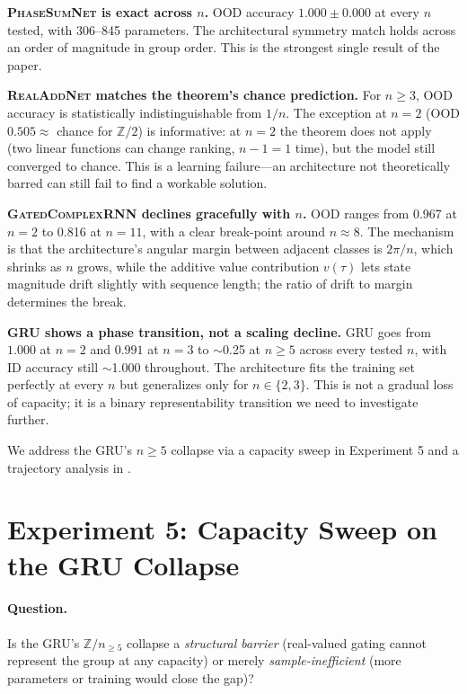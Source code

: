 \documentclass[11pt]{article}
\theoremstyle{definition}
\newcommand{\Z}{\mathbb{Z}}
\begin{document}
\textbf{\textsc{PhaseSumNet} is exact across $n$.} OOD accuracy
$1.000 \pm 0.000$ at every $n$ tested, with 306--845 parameters.
The architectural symmetry match holds across an order of magnitude
in group order. This is the strongest single result of the paper.

\textbf{\textsc{RealAddNet} matches the theorem's chance prediction.}
For $n \geq 3$, OOD accuracy is statistically indistinguishable from
$1/n$. The exception at $n=2$ (OOD $0.505 \approx$ chance for $\Z/2$)
is informative: at $n=2$ the theorem does not apply (two linear
functions can change ranking, $n-1=1$ time), but the model still
converged to chance. This is a learning failure---an architecture
not theoretically barred can still fail to find a workable
solution.

\textbf{\textsc{GatedComplexRNN} declines gracefully with $n$.}
OOD ranges from 0.967 at $n=2$ to 0.816 at $n=11$, with a clear
break-point around $n \approx 8$. The mechanism is that the
architecture's angular margin between adjacent classes is $2\pi/n$,
which shrinks as $n$ grows, while the additive value contribution
$v(\tau)$ lets state magnitude drift slightly with sequence length;
the ratio of drift to margin determines the break.

\textbf{\textsc{GRU} shows a phase transition, not a scaling decline.}
GRU goes from $1.000$ at $n=2$ and $0.991$ at $n=3$ to $\sim$0.25 at
$n \geq 5$ across every tested $n$, with ID accuracy still
$\sim$1.000 throughout. The architecture fits the training set
perfectly at every $n$ but generalizes only for $n \in \{2, 3\}$.
This is not a gradual loss of capacity; it is a binary
representability transition we need to investigate further.

We address the GRU's $n \geq 5$ collapse via a capacity sweep in
Experiment 5 and a trajectory analysis in .


\section{Experiment 5: Capacity Sweep on the GRU Collapse}
\label{sec:exp5}

\paragraph{Question.} Is the GRU's $\Z/n_{\geq 5}$ collapse a
\emph{structural barrier} (real-valued gating cannot represent the
group at any capacity) or merely \emph{sample-inefficient} (more
parameters or training would close the gap)?
\end{document}
